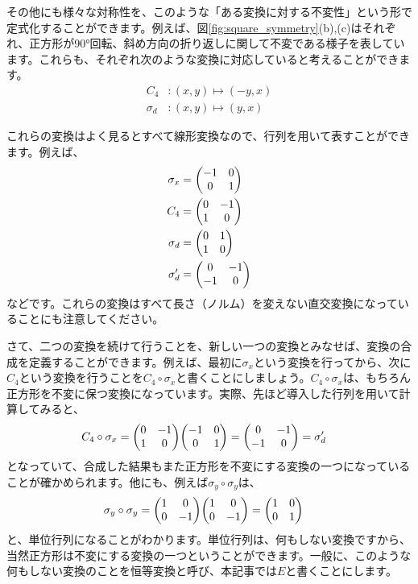 \documentclass[uplatex,dvipdfmx,a4j]{jsarticle}
\begin{document}
その他にも様々な対称性を、このような「ある変換に対する不変性」という形で定式化することができます。例えば、図\ref{fig:square_symmetry}(b),(c)はそれぞれ、正方形が90°回転、斜め方向の折り返しに関して不変である様子を表しています。これらも、それぞれ次のような変換に対応していると考えることができます。
\begin{align}
	C_4&: (x,y)\mapsto (-y,x)\\
	\sigma_d&: (x,y) \mapsto (y,x)
\end{align}

これらの変換はよく見るとすべて線形変換なので、行列を用いて表すことができます。例えば、
\begin{align}
	\sigma_x &= \mqty(-1 & 0 \\
					   0 & 1 ) \\
	C_4 &= \mqty(0 & -1 \\
				 1 & 0 )\\
	\sigma_d &= \mqty(0 & 1 \\
					1 & 0) \\
	\sigma_d' &= \mqty(0 & -1 \\
					  -1 & 0)
\end{align}
などです。これらの変換はすべて長さ（ノルム）を変えない直交変換になっていることにも注意してください。

さて、二つの変換を続けて行うことを、新しい一つの変換とみなせば、変換の合成を定義することができます。例えば、最初に$\sigma_x$という変換を行ってから、次に$C_4$という変換を行うことを$C_4 \circ \sigma_x$と書くことにしましょう。$C_4\circ \sigma_x$は、もちろん正方形を不変に保つ変換になっています。実際、先ほど導入した行列を用いて計算してみると、
\begin{align}
	C_4\circ \sigma_x &= 
	\mqty(	0	& -1 \\
		  	1	& 0 )
	\mqty(	-1	& 0 \\
			0	& 1 ) = 
	\mqty(	0	& -1 \\
			-1	& 0 ) = \sigma_d'
\end{align}
となっていて、合成した結果もまた正方形を不変にする変換の一つになっていることが確かめられます。他にも、例えば$\sigma_y\circ\sigma_y$は、
\begin{align}
	\sigma_y\circ\sigma_y &= 
	\mqty(	1	& 0 \\
			0	& -1 ) 
	\mqty(	1	& 0 \\
			0	& -1 ) = \mqty(\imat{2}) 		 
\end{align}
と、単位行列になることがわかります。単位行列は、何もしない変換ですから、当然正方形は不変にする変換の一つということができます。一般に、このような何もしない変換のことを恒等変換と呼び、本記事では$E$と書くことにします。
\end{document}

